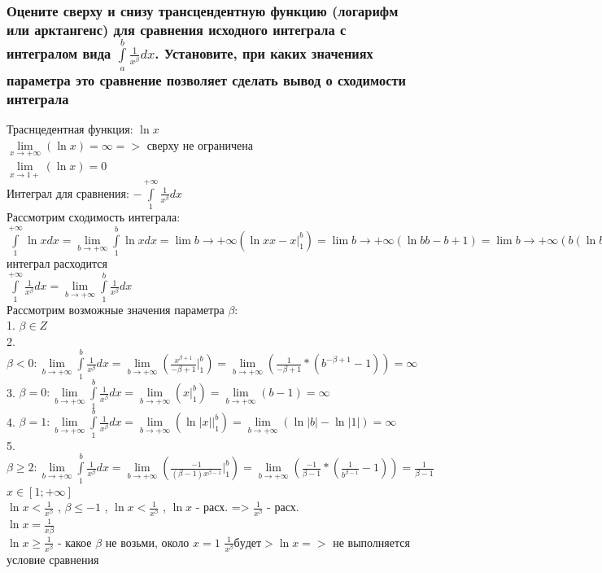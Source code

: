 \documentclass{article}
\begin{document}
\subsubsection{Оцените сверху и снизу трансцендентную функцию (логарифм или арктангенс) для сравнения исходного интеграла с интегралом вида $ \int\limits^b_a \frac{1}{x^{\beta}}dx $. Установите, при каких значениях параметра это сравнение позволяет сделать вывод о сходимости интеграла}
Траснцедентная функция: $ \ln{x} $\\
$ \lim\limits_{x \to +\infty} (\ln{x}) = \infty => $ сверху не ограничена\\
$ \lim\limits_{x \to 1+} (\ln{x}) = 0 $\\
Интеграл для сравнения: $ -\int\limits^{+\infty}_{1} \frac{1}{x^{\beta}}dx $\\
Рассмотрим сходимость интеграла:\\
$ \int\limits^{+\infty}_{1} \ln{x}dx = \lim\limits_{b \to +\infty} \int\limits^{b}_{1} \ln{x}dx = \lim\limits{b \to +\infty} (\ln{x}x - x |^b_1) = \lim\limits{b \to +\infty} (\ln{b}b - b + 1) = \lim\limits{b \to +\infty} (b(\ln{b} - 1) + 1) = \infty => $ интеграл расходится\\
$ \int\limits^{+\infty}_1 \frac{1}{x^{\beta}}dx = \lim\limits_{b \to +\infty} \int\limits^b_1 \frac{1}{x^{\beta}}dx $\\
Рассмотрим возможные значения параметра $\beta$:\\
1. $ \beta \in Z $\\
2. $ \beta < 0 : \lim\limits_{b \to +\infty} \int\limits^b_1 \frac{1}{x^{\beta}}dx = \lim\limits_{b \to +\infty} (\frac{x^{\beta + 1}}{-\beta + 1} |^b_1) = \lim\limits_{b \to +\infty} (\frac{1}{-\beta+1}*(b^{-\beta+1} - 1)) = \infty $\\
3. $ \beta = 0 : \lim\limits_{b \to +\infty} \int\limits^b_1 \frac{1}{x^{\beta}}dx = \lim\limits_{b \to +\infty} (x |^b_1) = \lim\limits_{b \to +\infty} (b - 1) = \infty $\\
4. $ \beta = 1 : \lim\limits_{b \to +\infty} \int\limits^b_1 \frac{1}{x^{\beta}}dx = \lim\limits_{b \to +\infty} (\ln{|x| |^b_1}) = \lim\limits_{b \to +\infty} (\ln{|b|} - \ln{|1|}) = \infty $\\
5. $ \beta \ge 2 : \lim\limits_{b \to +\infty} \int\limits^b_1 \frac{1}{x^{\beta}}dx = \lim\limits_{b \to +\infty} (\frac{-1}{(\beta - 1) x^{\beta - 1}} |^b_1) = \lim\limits_{b \to +\infty} (\frac{-1}{\beta - 1} * (\frac{1}{b^{\beta - 1}} - 1)) = \frac{1}{\beta - 1} $\\
\small $ x \in [1; +\infty] $\\
\normalsize
$ \ln{x} < \frac{1}{x^\beta} $ , $ \beta \leq -1 $ , $ \ln{x} < \frac{1}{x^{\beta}} $ , $ \ln{x} $ - расх. => $ \frac{1}{x^{\beta}} $ - расх.\\
$ \ln{x} = \frac{1}{x{\beta}} $ \\
$ \ln{x} \ge \frac{1}{x^{\beta}} $ - какое $\beta$ не возьми, около $ x = 1 $ $ \frac{1}{x^{\beta}} будет > \ln{x} => $ не выполняется условие сравнения
\end{document}
